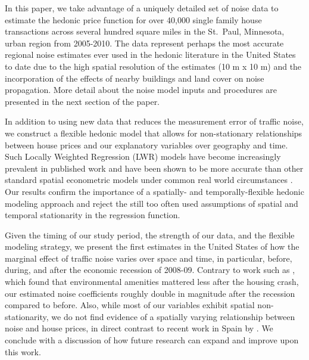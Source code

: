 \documentclass[leqno]{article}\usepackage[]{graphicx}\usepackage[]{color}
\begin{document}
In this paper, we take advantage of a uniquely detailed set of noise data to estimate the hedonic price function for over 40,000 single family house transactions across several hundred square miles in the St.\ Paul, Minnesota, urban region from 2005-2010.  The data represent perhaps the most accurate regional noise estimates ever used in the hedonic literature in the United States to date due to the high spatial resolution of the estimates (10 m x 10 m) and the incorporation of the effects of nearby buildings and land cover on noise propagation. More detail about the noise model inputs and procedures are presented in the next section of the paper. 

In addition to using new data that reduces the measurement error of traffic noise, we construct a flexible hedonic model that allows for non-stationary relationships between house prices and our explanatory variables over geography and time. Such Locally Weighted Regression (LWR) models have become increasingly prevalent in published work \citep[see][]{MarmolejoDuarteCarlos;GonzalezTamez2009, McMillen2010, Carruthers2010, Sunding2010, Nappi-Choulet2011} and have been shown to be more accurate than other standard spatial econometric models under common real world circumstances \citep{McMillen2012}. Our results confirm the importance of a spatially- and temporally-flexible hedonic modeling approach and reject the still too often used assumptions of spatial and temporal stationarity in the regression function.

Given the timing of our study period, the strength of our data, and the flexible modeling strategy, we present the first estimates in the United States of how the marginal effect of traffic noise varies over space and time, in particular, before, during, and after the  economic recession of 2008-09. Contrary to work such as \citet{Cho2011b}, which found that environmental amenities mattered less after the housing crash, our estimated noise coefficients roughly double in magnitude after the recession compared to before. Also, while most of our variables exhibit spatial non-stationarity, we do not find evidence of a spatially varying relationship between noise and house prices, in direct contrast to recent work in Spain by \citet{MarmolejoDuarteCarlos;GonzalezTamez2009}. We conclude with a discussion of how future research can expand and improve upon this work.
\end{document}
